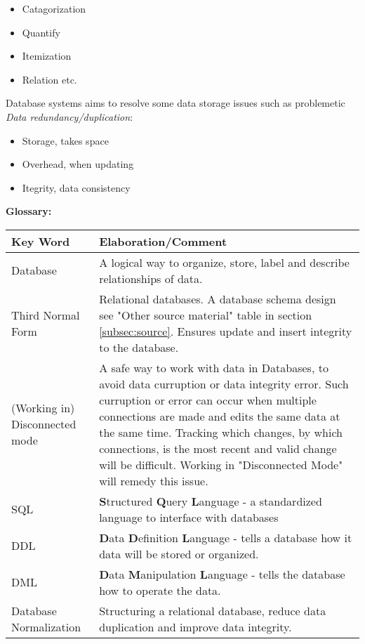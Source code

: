 {\begin{itemize}
    \item Catagorization
    \item Quantify
    \item Itemization
    \item Relation etc.
\end{itemize}


Database systems aims to resolve some data storage issues such as problemetic {\emph{Data redundancy/duplication}}:
\begin{itemize}
    \item Storage, takes space
    \item Overhead, when updating
    \item Itegrity, data consistency
\end{itemize}


{\bfseries{Glossary:}}


\begin{tabular}{p{20mm} | p{120mm}}
    {\bfseries{Key Word}} & {\bfseries{Elaboration/Comment}}\\ \hline
    Database & A logical way to organize, store, label and describe relationships of data.\\ \hline
    Third Normal Form & Relational databases. A database schema design see "Other source material" table in section \ref{subsec:source}. Ensures update and insert integrity to the database.\\ \hline
    (Working in) Disconnected mode & A safe way to work with data in Databases, to avoid data curruption or data integrity error. Such curruption or error can occur when multiple connections are made and edits the same data at the same time. Tracking which changes, by which connections, is the most recent and valid change will be difficult. Working in "Disconnected Mode" will remedy this issue.\\ \hline
    SQL & {\bfseries{S}}tructured {\bfseries{Q}}uery {\bfseries{L}}anguage - a standardized language to interface with databases\\ \hline
    DDL & {\bfseries{D}}ata {\bfseries{D}}efinition {\bfseries{L}}anguage - tells a database how it data will be stored or organized. \\ \hline
    DML & {\bfseries{D}}ata {\bfseries{M}}anipulation {\bfseries{L}}anguage - tells the database how to operate the data. \\ \hline
    Database Normalization & Structuring a relational database, reduce data duplication and improve data integrity. \\ \hline
\end{tabular}



}
